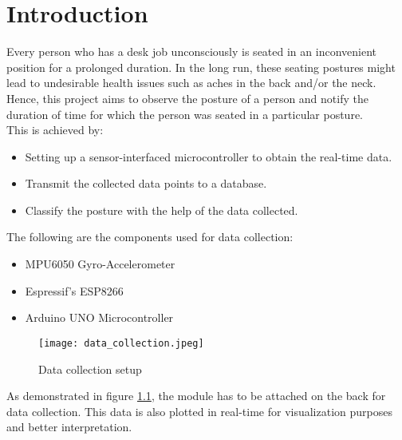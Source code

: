 \documentclass[./RTPostureTrackingReport.tex]{subfiles}
\begin{document}
\chapter{Introduction}\label{chap:intro}
Every person who has a desk job unconsciously is seated in an inconvenient
position for a prolonged duration. In the long run, these seating postures
might lead to undesirable health issues such as aches in the back and/or the
neck. Hence, this project aims to observe the posture of a person and notify
the duration of time for which the person was seated in a particular posture.
\\
This is achieved by:
\begin{itemize}
    \item Setting up a sensor-interfaced microcontroller to obtain the
        real-time data.
    \item Transmit the collected data points to a database.
    \item Classify the posture with the help of the data collected.
\end{itemize}

The following are the components used for data collection:
\begin{itemize}
    \item MPU6050 Gyro-Accelerometer
    \item Espressif's ESP8266
    \item Arduino UNO Microcontroller
\end{itemize}

\begin{figure}[H]
    \centering
    \texttt{[image: data\_collection.jpeg]}
    \caption{Data collection setup}
    \label{fig:datacollect}
\end{figure}

As demonstrated in figure \ref{fig:datacollect}, the module has to be attached
on the back for data collection. This data is also plotted in real-time for
visualization purposes and better interpretation.
\end{document}
